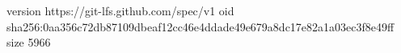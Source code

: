 version https://git-lfs.github.com/spec/v1
oid sha256:0aa356c72db87109dbeaf12cc46e4ddade49e679a8dc17e82a1a03ec3f8e49ff
size 5966
